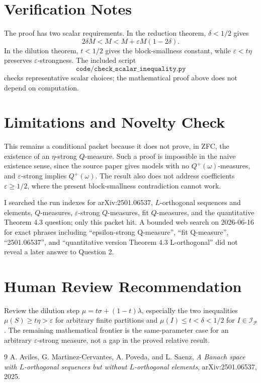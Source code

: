 \documentclass[11pt]{article}
\begin{document}
\section*{Verification Notes}

The proof has two scalar requirements.  In the reduction theorem,
\(\delta<1/2\) gives
\[
  2\delta M<M<M+\varepsilon M(1-2\delta).
\]
In the dilution theorem, \(t<1/2\) gives the block-smallness constant, while
\(\varepsilon<t\eta\) preserves \(\varepsilon\)-strongness.  The included script
\[
\texttt{code/check\_scalar\_inequality.py}
\]
checks representative scalar choices; the mathematical proof above does not
depend on computation.

\section*{Limitations and Novelty Check}

This remains a conditional packet because it does not prove, in ZFC, the
existence of an \(\eta\)-strong \(Q\)-measure.  Such a proof is impossible in
the naive existence sense, since the source paper gives models with no
\(Q^+(\omega)\)-measures, and \(\varepsilon\)-strong implies \(Q^+(\omega)\).
The result also does not address coefficients \(\varepsilon\ge 1/2\), where
the present block-smallness contradiction cannot work.

I searched the run indexes for arXiv:2501.06537, \(L\)-orthogonal sequences and
elements, \(Q\)-measures, \(\varepsilon\)-strong \(Q\)-measures, fit
\(Q\)-measures, and the quantitative Theorem 4.3 question; only this packet
hit.  A bounded web search on 2026-06-16 for exact phrases including
``epsilon-strong Q-measure'', ``fit Q-measure'', ``2501.06537'', and
``quantitative version Theorem 4.3 L-orthogonal'' did not reveal a later answer
to Question 2.

\section*{Human Review Recommendation}

Review the dilution step \(\mu=t\sigma+(1-t)\lambda\), especially the two
inequalities \(\mu(S)\ge t\eta>\varepsilon\) for arbitrary finite partitions
and \(\mu(I)\le t<\delta<1/2\) for \(I\in\mathcal I_{\mathcal P}\).  The
remaining mathematical frontier is the same-parameter case for an arbitrary
\(\varepsilon\)-strong measure, not a gap in the proved relative result.

\begin{thebibliography}{9}
A. Aviles, G. Martinez-Cervantes, A. Poveda, and L. Saenz,
\emph{A Banach space with \(L\)-orthogonal sequences but without
\(L\)-orthogonal elements},
arXiv:2501.06537, 2025.
\end{thebibliography}
\end{document}
